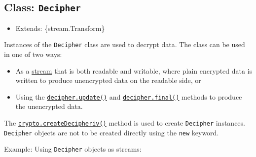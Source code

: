 \subsection{\texorpdfstring{Class:
\texttt{Decipher}}{Class: Decipher}}\label{class-decipher}

\begin{itemize}
\tightlist
\item
  Extends: \{stream.Transform\}
\end{itemize}

Instances of the \texttt{Decipher} class are used to decrypt data. The
class can be used in one of two ways:

\begin{itemize}
\tightlist
\item
  As a \href{stream.md}{stream} that is both readable and writable,
  where plain encrypted data is written to produce unencrypted data on
  the readable side, or
\item
  Using the
  \hyperref[decipherupdatedata-inputencoding-outputencoding]{\texttt{decipher.update()}}
  and \hyperref[decipherfinaloutputencoding]{\texttt{decipher.final()}}
  methods to produce the unencrypted data.
\end{itemize}

The
\hyperref[cryptocreatedecipherivalgorithm-key-iv-options]{\texttt{crypto.createDecipheriv()}}
method is used to create \texttt{Decipher} instances. \texttt{Decipher}
objects are not to be created directly using the \texttt{new} keyword.

Example: Using \texttt{Decipher} objects as streams:

